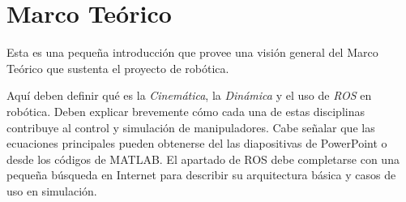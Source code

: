 \chapter{Marco Teórico} 
\label{chap:marco_teorico}

Esta es una pequeña introducción que provee una visión general del Marco Teórico que sustenta el proyecto de robótica. 

Aquí deben definir qué es la \textit{Cinemática}, la \textit{Dinámica} y el uso de \textit{ROS} en robótica. Deben explicar brevemente cómo cada una de estas disciplinas contribuye al control y simulación de manipuladores. Cabe señalar que las ecuaciones principales pueden obtenerse del las diapositivas de PowerPoint o desde los códigos de MATLAB. El apartado de ROS debe completarse con una pequeña búsqueda en Internet para describir su arquitectura básica y casos de uso en simulación.
